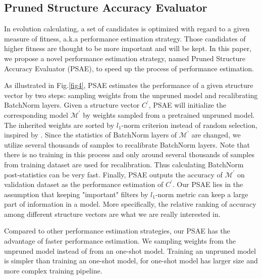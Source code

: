 \documentclass[final]{cvpr}
\begin{document}
\subsection{Pruned Structure Accuracy Evaluator}

In evolution calculating, a set of candidates is optimized with regard to a given measure of fitness, a.k.a performance estimation strategy.
Those candidates of higher fitness are thought to be more important and will be kept. In this paper, we propose a novel performance estimation strategy,
named Pruned Structure Accuracy Evaluator (PSAE), to speed up the process of performance estimation.

As illustrated in Fig.\ref{fig4}, PSAE estimates the performance of a given structure vector by two steps: 
sampling weights from the unpruned model and recalibrating BatchNorm layers. Given a structure vector $C^{'}$, PSAE will initialize the corresponding model $\mathcal{M^{'}}$ by weights 
sampled from a pretrained unpruned model. The inherited weights are sorted by $l_1$-norm criterion instead of random selection, inspired by \cite{li2016pruning}. 
Since the statistics of BatchNorm layers of $\mathcal{M^{'}}$ are changed, we utilize several thousands of samples to recalibrate BatchNorm layers. 
Note that there is no training in this process and only around several thousands of samples from training dataset are used for recalibration. Thus calculating BatchNorm
post-statistics can be very fast. Finally, PSAE outputs the accuracy of $\mathcal{M^{'}}$ on validation dataset as the performance estimation of $C^{'}$. 
Our PSAE lies in the assumption that keeping "important" filters by $l_1$-norm metric can keep a large part of information in a model. 
More specifically, the relative ranking of accuracy among different structure vectors are what we are really interested in.

Compared to other performance estimation strategies, our PSAE has the advantage of faster performance estimation. We sampling weights from
the unpruned model instead of from an one-shot model. Training an unpruned model is simpler than training an one-shot model, for one-shot model has larger size and
more complex training pipeline. 
\end{document}
